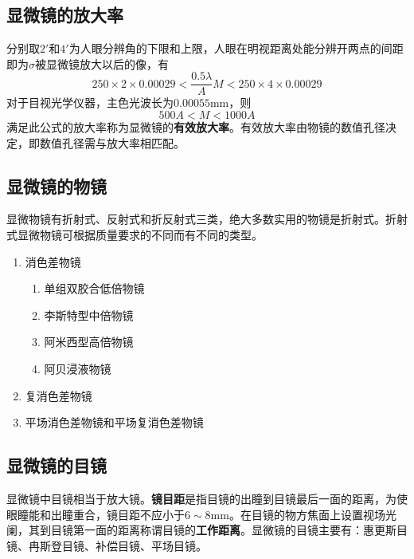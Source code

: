 \documentclass[cn,10pt,chinesefont=founder,math=newtx,cite=super,twoside]{elegantbook}
\begin{document}
\subsection{显微镜的放大率}
分别取$2'$和$4'$为人眼分辨角的下限和上限，人眼在明视距离处能分辨开两点的间距即为$\sigma$被显微镜放大以后的像，有
\begin{equation}
250\times2\times0.00029<\frac{0.5\lambda}{A}M<250\times4\times0.00029
\end{equation}
对于目视光学仪器，主色光波长为$0.00055\mathrm{mm}$，则
\begin{equation}
500A<M<1000A
\end{equation}
满足此公式的放大率称为显微镜的\textbf{有效放大率}。有效放大率由物镜的数值孔径决定，即数值孔径需与放大率相匹配。

\subsection{显微镜的物镜}

显微物镜有折射式、反射式和折反射式三类，绝大多数实用的物镜是折射式。折射式显微物镜可根据质量要求的不同而有不同的类型。
\begin{enumerate}
	\item 消色差物镜
	\begin{enumerate}
		\item 单组双胶合低倍物镜
		\item 李斯特型中倍物镜
		\item 阿米西型高倍物镜
		\item 阿贝浸液物镜
	\end{enumerate}
	\item 复消色差物镜
	\item 平场消色差物镜和平场复消色差物镜
\end{enumerate}

\subsection{显微镜的目镜}
显微镜中目镜相当于放大镜。\textbf{镜目距}是指目镜的出瞳到目镜最后一面的距离，为使眼瞳能和出瞳重合，镜目距不应小于$6\sim8\mathrm{mm}$。在目镜的物方焦面上设置视场光阑，其到目镜第一面的距离称谓目镜的\textbf{工作距离}。显微镜的目镜主要有：惠更斯目镜、冉斯登目镜、补偿目镜、平场目镜。
\end{document}
